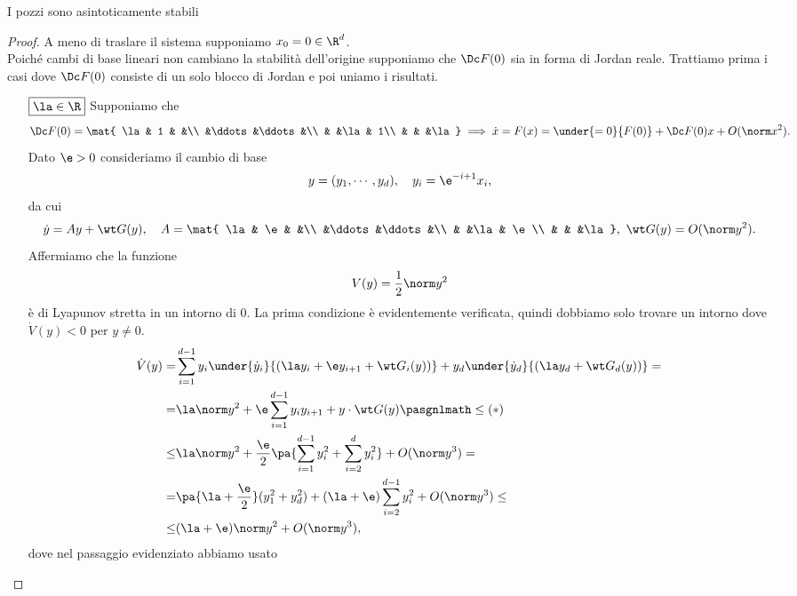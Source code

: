 \begin{proposition}\label{StabilitaPozzi}
    I pozzi sono asintoticamente stabili
\end{proposition}
\begin{proof}
    A meno di traslare il sistema supponiamo $x_0=0\in\R^d$.\\
    Poich\'e cambi di base lineari non cambiano la stabilit\`a dell'origine supponiamo che $\Dc F(0)$ sia in forma di Jordan reale. Trattiamo prima i casi dove $\Dc F(0)$ consiste di un solo blocco di Jordan e poi uniamo i risultati.
    \setlength{\leftmargini}{0cm}
    \begin{itemize}
        \item[$\boxed{\la\in\R}$] 
        Supponiamo che
        \[\Dc F(0)=\mat{
        \la & 1    &      &\\
            &\ddots&\ddots&\\
            &       &\la & 1\\
            &       &    &\la 
        }\implies \dot x=F(x)=\under{=0}{F(0)}+\Dc F(0)x+O(\norm x^2).\]
        Dato $\e>0$ consideriamo il cambio di base
        \[y=(y_1,\cdots, y_d),\quad y_i=\e^{-i+1}x_{i},\]
        da cui
        \[\dot y=A y+\wt G(y),\quad A=\mat{
        \la & \e    &      &\\
            &\ddots&\ddots&\\
            &       &\la & \e\\
            &       &    &\la 
        },\ {\wt G(y)}=O(\norm y^2).\]
        Affermiamo che la funzione
        \[V(y)=\frac12 \norm y^2\]
        \`e di Lyapunov stretta in un intorno di $0$. La prima condizione \`e evidentemente verificata, quindi dobbiamo solo trovare un intorno dove $\dot V(y)<0$ per $y\neq 0$.
        \begin{align*}
            \dot V(y)=&\sum_{i=1}^{d-1}y_i\under{\dot y_i}{(\la y_i+\e y_{i+1}+\wt G_i(y))}+y_d\under{\dot y_d}{(\la y_d+\wt G_d(y))}=\\
            =&\la\norm y^2+\e \sum_{i=1}^{d-1}y_iy_{i+1}+{y\cdot \wt G(y)}\pasgnlmath\leq{(\ast)}\\
            \leq& \la\norm y^2+\frac\e2 \pa{\sum_{i=1}^{d-1}y_i^2 +\sum_{i=2}^{d}y_i^2}+O(\norm y^3)=\\
            =&\pa{\la+\frac\e2}(y_1^2+y_d^2)+(\la+\e)\sum_{i=2}^{d-1}y_i^2+O(\norm y^3)\leq\\
            \leq& (\la+\e)\norm y^2+O(\norm y^3),
        \end{align*}
        dove nel passaggio evidenziato abbiamo usato 

\end{itemize}
\end{proof}
